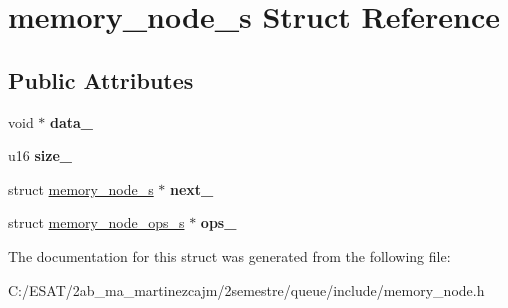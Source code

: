 \hypertarget{structmemory__node__s}{}\section{memory\+\_\+node\+\_\+s Struct Reference}
\label{structmemory__node__s}
\subsection*{Public Attributes}
\begin{DoxyCompactItemize}
\item 
\mbox{\label{structmemory__node__s_ae5c51b455c45732951edc8b5f9e205cf}} 
void $\ast$ {\bfseries data\+\_\+}
\item 
\mbox{\label{structmemory__node__s_aa8fbd1b47457157824d0e4bbb99f2721}} 
u16 {\bfseries size\+\_\+}
\item 
\mbox{\label{structmemory__node__s_a56e5430d28054fb5a0281bf3bc409acf}} 
struct \hyperlink{structmemory__node__s}{memory\+\_\+node\+\_\+s} $\ast$ {\bfseries next\+\_\+}
\item 
\mbox{\label{structmemory__node__s_a14e02a1ffddcb770d92d4a58658e35b9}} 
struct \hyperlink{structmemory__node__ops__s}{memory\+\_\+node\+\_\+ops\+\_\+s} $\ast$ {\bfseries ops\+\_\+}
\end{DoxyCompactItemize}


The documentation for this struct was generated from the following file\+:\begin{DoxyCompactItemize}
\item 
C\+:/\+E\+S\+A\+T/2ab\+\_\+ma\+\_\+martinezcajm/2semestre/queue/include/memory\+\_\+node.\+h\end{DoxyCompactItemize}
